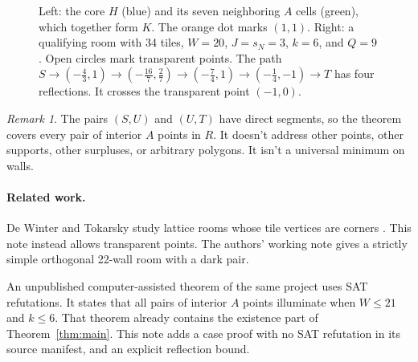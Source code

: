\documentclass[11pt]{article}
\theoremstyle{remark}
\newtheorem{remark}{Remark}
\begin{document}
\begin{figure}[ht]
\caption{Left: the core $H$ (blue) and its seven neighboring $A$ cells (green), which together form $K$. The orange dot marks $(1,1)$. Right: a qualifying room with 34 tiles, $W=20$, $J=s_N=3$, $k=6$, and $Q=9$. Open circles mark transparent points. The path $S\to(-\tfrac43,1)\to(-\tfrac{16}7,\tfrac27)\to(-\tfrac74,1)\to(-\tfrac14,-1)\to T$ has four reflections. It crosses the transparent point $(-1,0)$.}
\label{fig:room}
\end{figure}

\begin{remark}
The pairs $(S,U)$ and $(U,T)$ have direct segments, so the theorem covers every pair of interior $A$ points in $R$. It doesn't address other points, other supports, other surpluses, or arbitrary polygons. It isn't a universal minimum on walls.
\end{remark}

\paragraph{Related work.} De Winter and Tokarsky study lattice rooms whose tile vertices are corners \cite{DeWinterTokarsky2026}. This note instead allows transparent points. The authors' working note \cite{WangWang2026} gives a strictly simple orthogonal 22-wall room with a dark pair.

An unpublished computer-assisted theorem of the same project uses SAT refutations. It states that all pairs of interior $A$ points illuminate when $W\le21$ and $k\le6$. That theorem already contains the existence part of Theorem~\ref{thm:main}. This note adds a case proof with no SAT refutation in its source manifest, and an explicit reflection bound.
\end{document}
